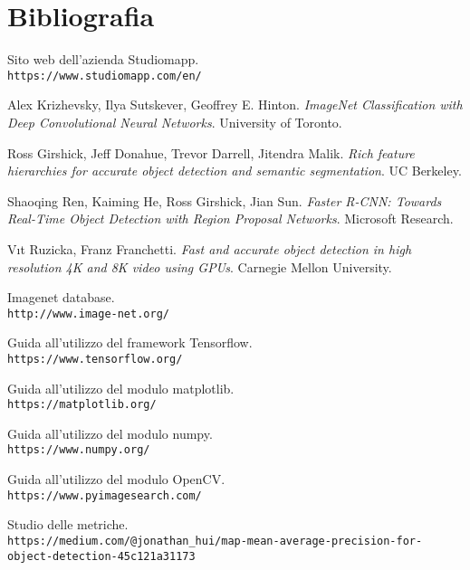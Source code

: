 \section{Bibliografia}

\begin{thebibliography}{99}

Sito web dell'azienda Studiomapp.
\\\texttt{https://www.studiomapp.com/en/}
 
Alex Krizhevsky, Ilya Sutskever, Geoffrey E. Hinton.
\textit{ImageNet Classification with Deep Convolutional
Neural Networks}. University of Toronto. 
 
Ross Girshick, Jeff Donahue, Trevor Darrell, Jitendra Malik.
\textit{Rich feature hierarchies for accurate object detection and semantic segmentation}. UC Berkeley. 
 
Shaoqing Ren, Kaiming He, Ross Girshick, Jian Sun.
\textit{Faster R-CNN: Towards Real-Time Object Detection
with Region Proposal Networks}. Microsoft Research.
 
Vıt Ruzicka, Franz Franchetti.
\textit{Fast and accurate object detection in high resolution 4K and 8K video using GPUs}. Carnegie Mellon University.

Imagenet database.
\\\texttt{http://www.image-net.org/}

Guida all'utilizzo del framework Tensorflow.
\\\texttt{https://www.tensorflow.org/}

Guida all'utilizzo del modulo matplotlib.
\\\texttt{https://matplotlib.org/}

Guida all'utilizzo del modulo numpy.
\\\texttt{https://www.numpy.org/}

Guida all'utilizzo del modulo OpenCV.
\\\texttt{https://www.pyimagesearch.com/}

Studio delle metriche.
\\\texttt{https://medium.com/@jonathan\_hui/map-mean-average-precision-for-object-detection-45c121a31173}

\end{thebibliography}